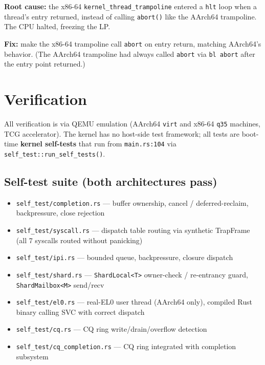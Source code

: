 \textbf{Root cause:} the x86-64 \texttt{kernel\_thread\_trampoline} entered a
\texttt{hlt} loop when a thread's entry returned, instead of calling
\texttt{abort()} like the AArch64 trampoline. The CPU halted, freezing the LP.

\textbf{Fix:} make the x86-64 trampoline call \texttt{abort} on entry return,
matching AArch64's behavior. (The AArch64 trampoline had always called
\texttt{abort} via \texttt{bl abort} after the entry point returned.)

\section{Verification}

All verification is via QEMU emulation (AArch64 \texttt{virt} and x86-64
\texttt{q35} machines, TCG accelerator). The kernel has no host-side test
framework; all tests are boot-time \textbf{kernel self-tests} that run from
\texttt{main.rs:104} via \texttt{self\_test::run\_self\_tests()}.

\subsection{Self-test suite (both architectures pass)}

\begin{itemize}
    \item \texttt{self\_test/completion.rs} --- buffer ownership, cancel /
        deferred-reclaim, backpressure, close rejection
    \item \texttt{self\_test/syscall.rs} --- dispatch table routing via
        synthetic TrapFrame (all 7 syscalls routed without panicking)
    \item \texttt{self\_test/ipi.rs} --- bounded queue, backpressure, closure
        dispatch
    \item \texttt{self\_test/shard.rs} --- \texttt{ShardLocal<T>} owner-check /
        re-entrancy guard, \texttt{ShardMailbox<M>} send/recv
    \item \texttt{self\_test/el0.rs} --- real-EL0 user thread (AArch64 only),
        compiled Rust binary calling SVC with correct dispatch
    \item \texttt{self\_test/cq.rs} --- CQ ring write/drain/overflow detection
    \item \texttt{self\_test/cq\_completion.rs} --- CQ ring integrated with
        completion subsystem
\end{itemize}

